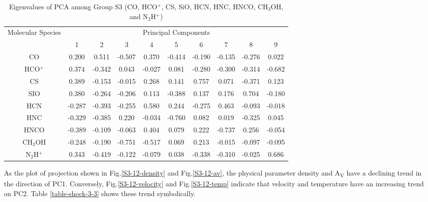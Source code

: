 \documentclass{aa}
\begin{document}
\begin{CJK*}{UTF8}{gbsn}
    \begin{table}[htbp]
        \centering
        \begin{tabular}{cccccccccc}
        \hline\hline
        \multirow{2}{*}{Molecular Species} & \multicolumn{9}{c}{Principal Components}                 \\ \cline{2-10} 
                                           & 1       & 2       & 3       & 4       & 5      & 6    & 7       & 8      & 9   \\ \hline
        CO    & 0.200  & 0.511  & -0.507 & 0.370  & -0.414 & -0.190 & -0.135 & -0.276 & 0.022  \\ \hline
        HCO$^+$     & 0.374  & -0.342 & 0.043  & -0.027  & 0.081   & -0.280 & -0.300    & -0.314 & -0.682  \\ \hline
        CS    & 0.389  & -0.153 & -0.015 & 0.268  & 0.141  & 0.757  & 0.071  & -0.371 & 0.123 \\ \hline
        SIO   & 0.380  & -0.264 & -0.206  & 0.113  & -0.388 & 0.137   & 0.176  & 0.704  & -0.180 \\ \hline
        HCN   & -0.287 & -0.393 & -0.255 & 0.580  & 0.244  & -0.275 & 0.463  & -0.093 & -0.018 \\ \hline
        HNC   & -0.329 & -0.385 & 0.220  & -0.034 & -0.760 & 0.082  & 0.019  & -0.325 & 0.045 \\ \hline
        HNCO  & -0.389 & -0.109 & -0.063 & 0.404  & 0.079  & 0.222  & -0.737 & 0.256  & -0.054 \\ \hline
        CH$_3$OH & -0.248 & -0.190 & -0.751 & -0.517 & 0.069  & 0.213  & -0.015 & -0.097 & -0.095 \\ \hline
        N$_2$H$^+$  & 0.343  & -0.419 & -0.122 & -0.079 & 0.038  & -0.338 & -0.310 & -0.025 & 0.686 \\ \hline\hline
        \end{tabular}
        \caption{Eigenvalues of PCA among Group S3 (CO, HCO$^+$, CS, SiO, HCN, HNC, HNCO, CH$_3$OH, and N$_2$H$^+$)}
        \label{table-shock-3-eigen}
    \end{table}


    As the plot of projection shown in Fig.\ref{S3-12-density} and Fig.\ref{S3-12-av}, the physical parameter density and A\textsubscript{V} have a declining trend in the direction of PC1. 
    Conversely, Fig.\ref{S3-12-velocity} and Fig.\ref{S3-12-temp} indicate that velocity and temperature have an increasing trend on PC2. 
    Table \ref{table-shock-3-3} shows these trend symbolically. 


\end{CJK*}
\end{document}
